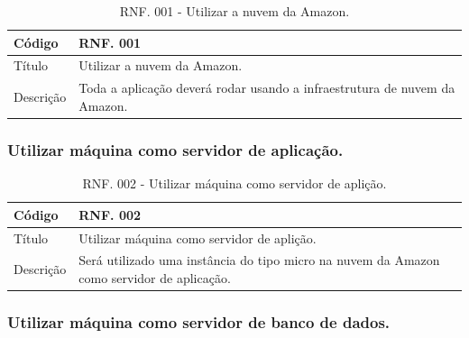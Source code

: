 \documentclass[11pt]{article}
\begin{document}
        \begin{table}[h]
          \begin{center}
            \begin{tabular}{ | p{5cm} | p{10cm} | }
              \hline
              Código\cellcolor{gray} & RNF. 001\cellcolor{gray} \\
              \hline
              Título & Utilizar a nuvem da Amazon. \\
              \hline
              Descrição & Toda a aplicação deverá rodar usando a infraestrutura de nuvem da Amazon. \\
              \hline
            \end{tabular}
            \caption{RNF. 001 - Utilizar a nuvem da Amazon.}
          \end{center}
        \end{table}

      \subsubsection{Utilizar máquina como servidor de aplicação.}

        \begin{table}[h]
          \begin{center}
            \begin{tabular}{ | p{5cm} | p{10cm} | }
              \hline
              Código\cellcolor{gray} & RNF. 002\cellcolor{gray} \\
              \hline
              Título & Utilizar máquina como servidor de aplição. \\
              \hline
              Descrição & Será utilizado uma instância do tipo micro na nuvem da Amazon como servidor de aplicação. \\
              \hline
            \end{tabular}
            \caption{RNF. 002 - Utilizar máquina como servidor de aplição.}
          \end{center}
        \end{table}

      \subsubsection{Utilizar máquina como servidor de banco de dados.}
\end{document}
